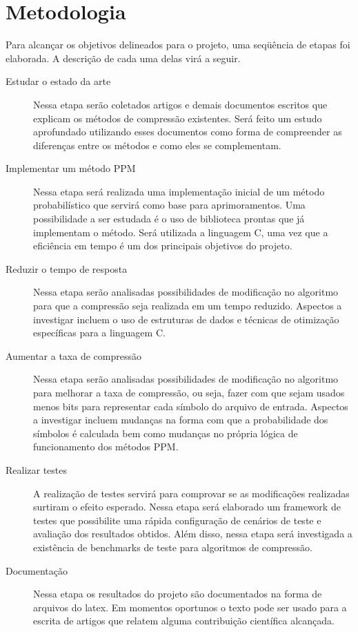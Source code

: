 \documentclass[a4paper,12pt,oneside]{article}
\begin{document}
\section{Metodologia}
\label{sec:metodologia}

Para alcançar os objetivos delineados para o projeto, uma seqüência de etapas foi elaborada. A descrição de cada uma delas virá a seguir.


\begin{description}


	
	\item[Estudar o estado da arte] 
Nessa etapa serão coletados artigos e demais documentos escritos que explicam os métodos de compressão existentes. Será feito um estudo aprofundado utilizando esses documentos como forma de compreender as diferenças entre os métodos e como eles se complementam.

  \item[Implementar  um método PPM]
Nessa etapa será realizada uma implementação inicial de um método probabilístico que servirá como base para aprimoramentos. Uma possibilidade a ser estudada é o uso de biblioteca prontas que já implementam o método. Será utilizada a linguagem C, uma vez que a eficiência em tempo é um dos principais objetivos do projeto. 

\item[Reduzir o tempo de resposta]
Nessa etapa serão analisadas possibilidades de modificação no algoritmo para que a compressão seja realizada em um tempo reduzido. Aspectos a investigar incluem o uso de estruturas de dados e técnicas de otimização específicas para a linguagem C.  

\item[Aumentar a taxa de compressão]
Nessa etapa serão analisadas possibilidades de modificação no algoritmo para melhorar a taxa de compressão, ou seja, fazer com que sejam usados menos bits para representar cada símbolo do arquivo de entrada. Aspectos a investigar incluem mudanças na forma com que a probabilidade dos símbolos é calculada bem como mudanças no própria lógica de funcionamento dos métodos PPM. 

\item[Realizar testes]
A realização de testes servirá para comprovar se as modificações realizadas surtiram o efeito esperado. Nessa etapa será elaborado um framework de testes que possibilite uma rápida configuração de cenários de teste e avaliação dos resultados obtidos. Além disso, nessa etapa será investigada a existência de benchmarks de teste para algoritmos de compressão. 

\item[Documentação]
Nessa etapa os resultados do projeto são documentados na forma de arquivos do latex. Em momentos oportunos o texto pode ser usado para a escrita de artigos que relatem alguma contribuição científica alcançada.


\end{description}
\end{document}
